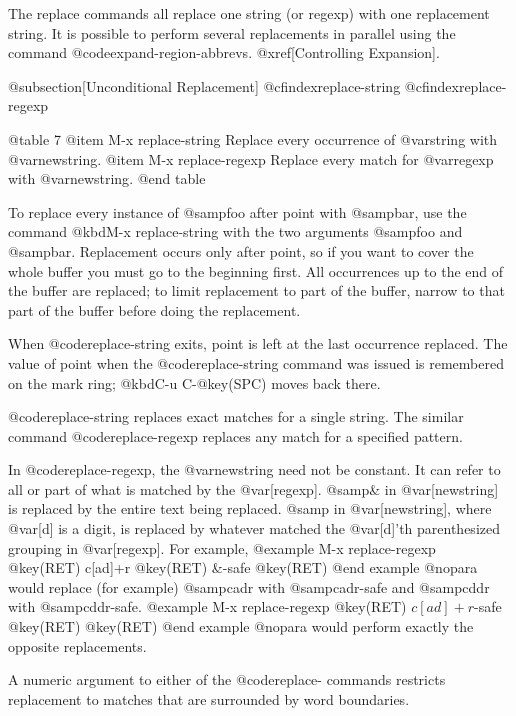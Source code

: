 {{{{{{{{{{{{{{{{  The replace commands all replace one string (or regexp) with one
replacement string.  It is possible to perform several replacements in
parallel using the command @code{expand-region-abbrevs}.  @xref[Controlling
Expansion].

@subsection[Unconditional Replacement]
@cfindex{replace-string}
@cfindex{replace-regexp}

@table 7
@item M-x replace-string
Replace every occurrence of @var{string} with @var{newstring}.
@item M-x replace-regexp
Replace every match for @var{regexp} with @var{newstring}.
@end table

  To replace every instance of @samp{foo} after point with @samp{bar}, use
the command @kbd{M-x replace-string} with the two arguments @samp{foo} and
@samp{bar}.  Replacement occurs only after point, so if you want to cover
the whole buffer you must go to the beginning first.  All occurrences up to
the end of the buffer are replaced; to limit replacement to part of the
buffer, narrow to that part of the buffer before doing the replacement.

  When @code{replace-string} exits, point is left at the last occurrence
replaced.  The value of point when the @code{replace-string} command was
issued is remembered on the mark ring; @kbd{C-u C-@key(SPC)} moves back
there.

  @code{replace-string} replaces exact matches for a single string.  The
similar command @code{replace-regexp} replaces any match for a specified
pattern.

  In @code{replace-regexp}, the @var{newstring} need not be constant.  It can
refer to all or part of what is matched by the @var[regexp].  @samp{\&}
in @var[newstring] is replaced by the entire text being replaced.  @samp{\@var[d]}
in @var[newstring], where @var[d] is a digit, is replaced by whatever
matched the @var[d]'th parenthesized grouping in @var[regexp].  For example,
@example
M-x replace-regexp @key(RET) c[ad]+r @key(RET) \&-safe @key(RET)
@end example
@nopara
would replace (for example) @samp{cadr} with @samp{cadr-safe} and
@samp{cddr} with @samp{cddr-safe}.
@example
M-x replace-regexp @key(RET) \(c[ad]+r\)-safe @key(RET) \1 @key(RET)
@end example
@nopara
would perform exactly the opposite replacements.

  A numeric argument to either of the @code{replace-} commands restricts
replacement to matches that are surrounded by word boundaries.

}}}}}}}}}}}}}}}}
